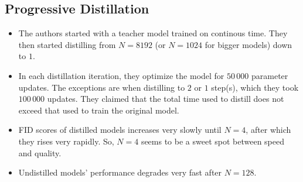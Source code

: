 \documentclass[10pt]{article}
\begin{document}
\subsection{Progressive Distillation}

\begin{itemize}
  \item The authors started with a teacher model trained on continous time. They then started distilling from $N = 8192$ (or $N = 1024$ for bigger models) down to $1$.
  
  \item In each distillation iteration, they optimize the model for $50\,000$ parameter updates. The exceptions are when distilling to $2$ or $1$ step(s), which they took $100\,000$ updates. They claimed that the total time used to distill does not exceed that used to train the original model.
  
  \item FID scores of distilled models increases very slowly until $N = 4$, after which they rises very rapidly. So, $N = 4$ seems to be a sweet spot between speed and quality.
  
  \item Undistilled models' performance degrades very fast after $N = 128$.
\end{itemize}


  
\end{document}
